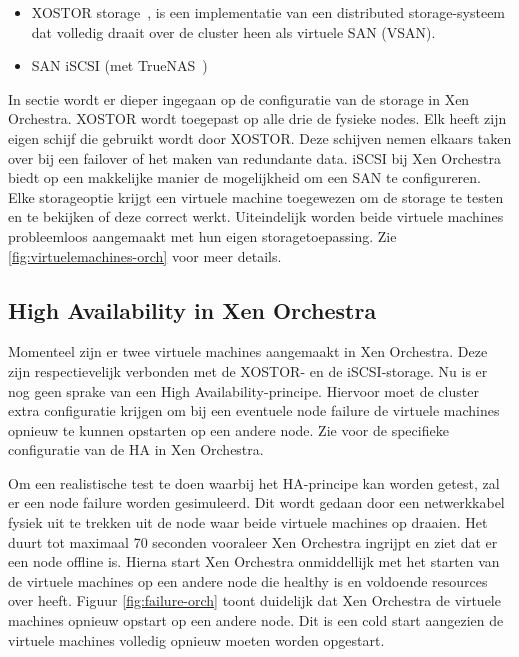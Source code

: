 \begin{itemize}
    \item XOSTOR storage~\autocite{vates_xostor}, is een implementatie van een distributed storage-systeem dat volledig draait over de cluster heen als virtuele SAN (VSAN).
    \item SAN iSCSI (met TrueNAS~\autocite{truenas})
\end{itemize}
In sectie  wordt er dieper ingegaan op de configuratie van de storage in Xen Orchestra.  
XOSTOR wordt toegepast op alle drie de fysieke nodes. Elk heeft zijn eigen schijf die gebruikt wordt door XOSTOR. Deze schijven nemen elkaars taken over bij een failover of het maken van redundante data.  
iSCSI bij Xen Orchestra biedt op een makkelijke manier de mogelijkheid om een SAN te configureren.  
Elke storageoptie krijgt een virtuele machine toegewezen om de storage te testen en te bekijken of deze correct werkt.  
Uiteindelijk worden beide virtuele machines probleemloos aangemaakt met hun eigen storagetoepassing. Zie \ref{fig:virtuelemachines-orch} voor meer details.

\subsection{High Availability in Xen Orchestra}%
Momenteel zijn er twee virtuele machines aangemaakt in Xen Orchestra. Deze zijn respectievelijk verbonden met de XOSTOR- en de iSCSI-storage.  
Nu is er nog geen sprake van een High Availability-principe. Hiervoor moet de cluster extra configuratie krijgen om bij een eventuele node failure de virtuele machines opnieuw te kunnen opstarten op een andere node.  
Zie  voor de specifieke configuratie van de HA in Xen Orchestra.

Om een realistische test te doen waarbij het HA-principe kan worden getest, zal er een node failure worden gesimuleerd.  
Dit wordt gedaan door een netwerkkabel fysiek uit te trekken uit de node waar beide virtuele machines op draaien.  
Het duurt tot maximaal 70 seconden vooraleer Xen Orchestra ingrijpt en ziet dat er een node offline is. Hierna start Xen Orchestra onmiddellijk met het starten van de virtuele machines op een andere node die healthy is en voldoende resources over heeft.  
Figuur \ref{fig:failure-orch} toont duidelijk dat Xen Orchestra de virtuele machines opnieuw opstart op een andere node. Dit is een cold start aangezien de virtuele machines volledig opnieuw moeten worden opgestart.

